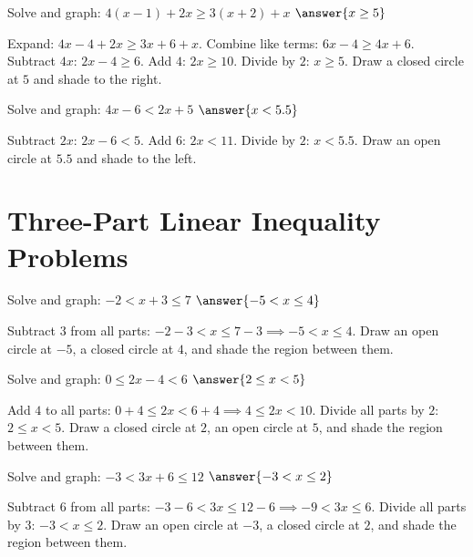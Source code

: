 \documentclass{ximera}
\begin{document}
\begin{problem}
Solve and graph: $4(x - 1) + 2x \geq 3(x + 2) + x$ $\answer{x \geq 5}$
\begin{feedback}
Expand: $4x - 4 + 2x \geq 3x + 6 + x$. Combine like terms: $6x - 4 \geq 4x + 6$. Subtract $4x$: $2x - 4 \geq 6$. Add $4$: $2x \geq 10$. Divide by $2$: $x \geq 5$. Draw a closed circle at $5$ and shade to the right.
\end{feedback}
\end{problem}

\begin{problem}
Solve and graph: $4x - 6 < 2x + 5$ $\answer{x < 5.5}$
\begin{feedback}
Subtract $2x$: $2x - 6 < 5$. Add $6$: $2x < 11$. Divide by $2$: $x < 5.5$. Draw an open circle at $5.5$ and shade to the left.
\end{feedback}
\end{problem}



\section*{Three-Part Linear Inequality Problems}

\begin{problem}
Solve and graph: $-2 < x + 3 \leq 7$ $\answer{-5 < x \leq 4}$
\begin{feedback}
Subtract $3$ from all parts: $-2 - 3 < x \leq 7 - 3 \implies -5 < x \leq 4$. Draw an open circle at $-5$, a closed circle at $4$, and shade the region between them.
\end{feedback}
\end{problem}

\begin{problem}
Solve and graph: $0 \leq 2x - 4 < 6$ $\answer{2 \leq x < 5}$
\begin{feedback}
Add $4$ to all parts: $0 + 4 \leq 2x < 6 + 4 \implies 4 \leq 2x < 10$. Divide all parts by $2$: $2 \leq x < 5$. Draw a closed circle at $2$, an open circle at $5$, and shade the region between them.
\end{feedback}
\end{problem}

\begin{problem}
Solve and graph: $-3 < 3x + 6 \leq 12$ $\answer{-3 < x \leq 2}$
\begin{feedback}
Subtract $6$ from all parts: $-3 - 6 < 3x \leq 12 - 6 \implies -9 < 3x \leq 6$. Divide all parts by $3$: $-3 < x \leq 2$. Draw an open circle at $-3$, a closed circle at $2$, and shade the region between them.
\end{feedback}
\end{problem}
\end{document}
